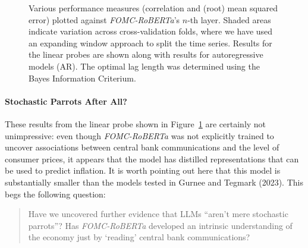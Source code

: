 \documentclass[
  letterpaper,
  DIV=11,
  numbers=noendperiod]{scrartcl}
\let\oldparagraph\paragraph
\renewcommand{\paragraph}[1]{\oldparagraph{#1}\mbox{}}
\theoremstyle{plain}
\theoremstyle{remark}
\begin{document}
\begin{figure}


\caption{\label{fig-fomc}Various performance measures (correlation and
(root) mean squared error) plotted against \emph{FOMC-RoBERTa}'s
\(n\)-th layer. Shaded areas indicate variation across cross-validation
folds, where we have used an expanding window approach to split the time
series. Results for the linear probes are shown along with results for
autoregressive models (AR). The optimal lag length was determined using
the Bayes Information Criterium.}

\end{figure}%

\paragraph{Stochastic Parrots After
All?}\label{stochastic-parrots-after-all}

These results from the linear probe shown in Figure~\ref{fig-fomc} are
certainly not unimpressive: even though \emph{FOMC-RoBERTa} was not
explicitly trained to uncover associations between central bank
communications and the level of consumer prices, it appears that the
model has distilled representations that can be used to predict
inflation. It is worth pointing out here that this model is
substantially smaller than the models tested in Gurnee and Tegmark
(2023). This begs the following question:

\begin{quote}
Have we uncovered further evidence that LLMs ``aren't mere stochastic
parrots''? Has \emph{FOMC-RoBERTa} developed an intrinsic understanding
of the economy just by `reading' central bank communications?
\end{quote}
\end{document}
